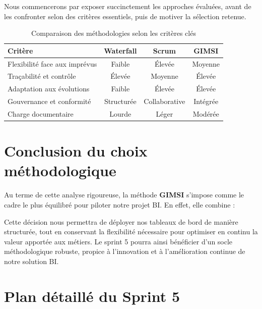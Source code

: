 \documentclass[a4paper,11pt]{report}
\begin{document}
Nous commencerons par exposer succinctement les approches évaluées, avant de les confronter selon des critères essentiels, puis de motiver la sélection retenue.

\vspace{1em}
\begin{table}[h!]
  \centering
  \begin{tabular}{@{}lccc@{}}
    \toprule
    \rowcolor{blue!30} \textbf{Critère}             & \textbf{Waterfall} & \textbf{Scrum}   & \textbf{GIMSI}    \\
    \midrule
    Flexibilité face aux imprévus    & Faible             & Élevée           & Moyenne           \\
    Traçabilité et contrôle          & Élevée             & Moyenne          & Élevée            \\
    Adaptation aux évolutions        & Faible             & Élevée           & Élevée            \\
    Gouvernance et conformité        & Structurée         & Collaborative    & Intégrée          \\
    Charge documentaire              & Lourde             & Léger            & Modérée           \\
    \bottomrule
  \end{tabular}
  \caption{Comparaison des méthodologies selon les critères clés}
  \label{tab:comparaison-methodos}
\end{table}



\section*{Conclusion du choix méthodologique}

Au terme de cette analyse rigoureuse, la méthode \textbf{GIMSI} s’impose comme le cadre le plus équilibré pour piloter notre projet BI. En effet, elle combine :



Cette décision nous permettra de déployer nos tableaux de bord de manière structurée, tout en conservant la flexibilité nécessaire pour optimiser en continu la valeur apportée aux métiers. Le sprint 5 pourra ainsi bénéficier d’un socle méthodologique robuste, propice à l’innovation et à l’amélioration continue de notre solution BI.  


\section{Plan détaillé du Sprint 5}
\end{document}
